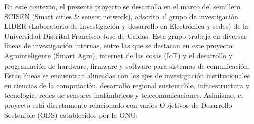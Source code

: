 En este contexto, el presente proyecto se desarrolla en el marco  del  semillero
SCISEN (Smart cities \& sensor network),  adscrito  al  grupo  de  investigación
LIDER (Laboratorio de Investigación y desarrollo en Electrónica y redes)  de  la
Universidad Distrital Francisco José de Caldas. Este grupo trabaja  en  diversas
líneas de investigación internas, entre las que se destacan  en  este  proyecto:
Agrointeligente (Smart Agro), internet de las cosas  (IoT)  y  el  desarrollo  y
programación de hardware, firmware y software  para  sistemas  de  comunicación.
Estas  líneas  se  encuentran  alineadas   con   los   ejes   de   investigación
institucionales en ciencias de la computación, desarrollo regional  sustentable,
infraestructura   y   tecnología,   redes    de    sensores    inalámbricos    y
telecomunicaciones. Asimismo, el  proyecto  está  directamente  relacionado  con
varios Objetivos de Desarrollo Sostenible (ODS) establecidos por la ONU: \\
